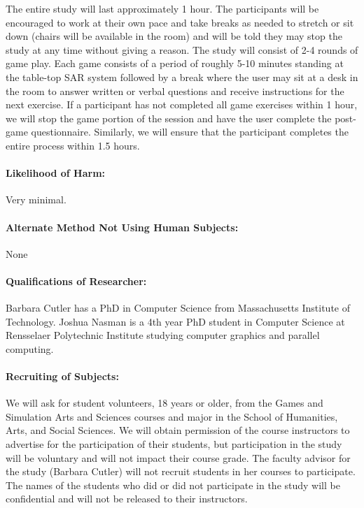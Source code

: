 \documentclass[10pt]{article}
\begin{document}
\begin{itemize}
\end{itemize}

\noindent 
The entire study will last approximately 1 hour.  The participants
will be encouraged to work at their own pace and take breaks as needed
to stretch or sit down (chairs will be available in the room) and will
be told they may stop the study at any time without giving a reason.
The study will consist of 2-4 rounds of game play.  Each game consists
of a period of roughly 5-10 minutes standing at the table-top SAR
system followed by a break where the user may sit at a desk in the
room to answer written or verbal questions and receive instructions
for the next exercise.  If a participant has not completed all game
exercises within 1 hour, we will stop the game portion of the session
and have the user complete the post-game questionnaire.  Similarly, we
will ensure that the participant completes the entire process within
1.5 hours.

\paragraph{Likelihood of Harm:}   Very minimal.

\paragraph{Alternate Method Not Using Human Subjects:}
None

\paragraph{Qualifications of Researcher:}
Barbara Cutler has a PhD in Computer Science from Massachusetts
Institute of Technology.  Joshua Nasman is a 4th year PhD student in
Computer Science at Rensselaer Polytechnic Institute studying computer
graphics and parallel computing.

\paragraph{Recruiting of Subjects:}
We will ask for student volunteers, 18 years or older, from the Games
and Simulation Arts and Sciences courses and major in the School of
Humanities, Arts, and Social Sciences.  We will obtain permission of
the course instructors to advertise for the participation of their
students, but participation in the study will be voluntary and will
not impact their course grade.  The faculty advisor for the study
(Barbara Cutler) will not recruit students in her courses to
participate.  The names of the students who did or did not participate
in the study will be confidential and will not be released to their
instructors.
\end{document}
